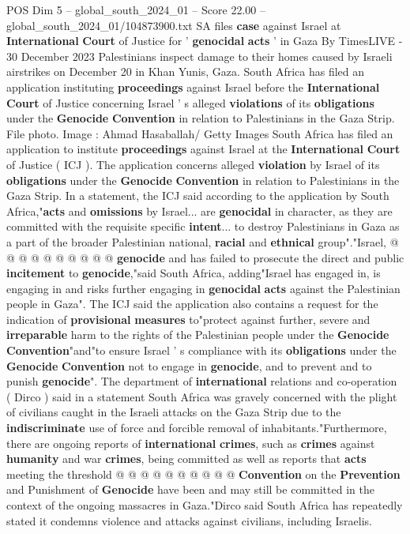 \begin{textsample}{POS Dim 5 – global\_south\_2024\_01 – Score 22.00 – global\_south\_2024\_01/104873900.txt}  \label{ex:f5_pos_008}
SA files \textbf{case} against Israel at \textbf{International} \textbf{Court} of Justice for ' \textbf{genocidal} \textbf{acts} ' in Gaza By TimesLIVE - 30 December 2023 Palestinians inspect damage to their homes caused by Israeli airstrikes on December 20 in Khan Yunis, Gaza.
South Africa has filed an application instituting \textbf{proceedings} against Israel before the \textbf{International} \textbf{Court} of Justice concerning Israel ' s alleged \textbf{violations} of its \textbf{obligations} under the \textbf{Genocide} \textbf{Convention} in relation to Palestinians in the Gaza Strip.
File photo.
Image : Ahmad Hasaballah/ Getty Images South Africa has filed an application to institute \textbf{proceedings} against Israel at the \textbf{International} \textbf{Court} of Justice ( ICJ ).
The application concerns alleged \textbf{violation} by Israel of its \textbf{obligations} under the \textbf{Genocide} \textbf{Convention} in relation to Palestinians in the Gaza Strip.
In a statement, the ICJ said according to the application by South Africa,"\textbf{acts} and \textbf{omissions} by Israel... are \textbf{genocidal} in character, as they are committed with the requisite specific \textbf{intent}... to destroy Palestinians in Gaza as a part of the broader Palestinian national, \textbf{racial} and \textbf{ethnical} group"."Israel, @ @ @ @ @ @ @ @ @ @ \textbf{genocide} and has failed to prosecute the direct and public \textbf{incitement} to \textbf{genocide},"said South Africa, adding"Israel has engaged in, is engaging in and risks further engaging in \textbf{genocidal} \textbf{acts} against the Palestinian people in Gaza".
The ICJ said the application also contains a request for the indication of \textbf{provisional} \textbf{measures} to"protect against further, severe and \textbf{irreparable} harm to the rights of the Palestinian people under the \textbf{Genocide} \textbf{Convention}"and"to ensure Israel ' s compliance with its \textbf{obligations} under the \textbf{Genocide} \textbf{Convention} not to engage in \textbf{genocide}, and to prevent and to punish \textbf{genocide}".
The department of \textbf{international} relations and co-operation ( Dirco ) said in a statement South Africa was gravely concerned with the plight of civilians caught in the Israeli attacks on the Gaza Strip due to the \textbf{indiscriminate} use of force and forcible removal of inhabitants."Furthermore, there are ongoing reports of \textbf{international} \textbf{crimes}, such as \textbf{crimes} against \textbf{humanity} and war \textbf{crimes}, being committed as well as reports that \textbf{acts} meeting the threshold @ @ @ @ @ @ @ @ @ @ \textbf{Convention} on the \textbf{Prevention} and Punishment of \textbf{Genocide} have been and may still be committed in the context of the ongoing massacres in Gaza."Dirco said South Africa has repeatedly stated it condemns violence and attacks against civilians, including Israelis.

\end{textsample}

